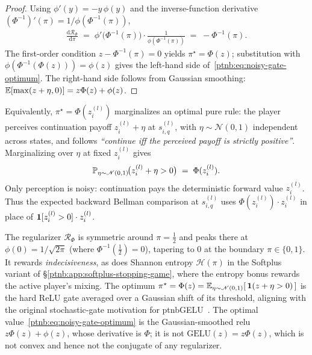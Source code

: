 \begin{proof}
Using $\phi'(y) = -y\,\phi(y)$ and the inverse-function derivative $(\Phi^{-1})'(\pi) =
    1/\phi(\Phi^{-1}(\pi))$,
\begin{align}\label{ptnb:eq:noisy-gate-deriv}
    \frac{\mathrm{d}\mathcal{R}_\Phi}{\mathrm{d}\pi}
    \;=\; \phi'\!\bigl(\Phi^{-1}(\pi)\bigr) \cdot \frac{1}{\phi(\Phi^{-1}(\pi))}
    \;=\; -\Phi^{-1}(\pi).
\end{align}
The first-order condition $z - \Phi^{-1}(\pi) = 0$ yields $\pi^\star = \Phi(z)$; substitution
with $\phi(\Phi^{-1}(\Phi(z))) = \phi(z)$ gives the left-hand side
of~\eqref{ptnb:eq:noisy-gate-optimum}. The right-hand side follows from Gaussian smoothing:
$\E[\max(z+\eta,0)] = z\Phi(z) + \phi(z)$.
\end{proof}

\begin{remark}\label{ptnb:rem:noisy-gate-perception}
Equivalently, $\pi^\star = \Phi(z_i^{(l)})$ marginalizes an optimal pure rule: the player perceives
continuation payoff $z_i^{(l)} + \eta$ at $s_{i,q}^{(l)}$, with $\eta \sim \mathcal{N}(0,1)$
independent across states, and follows \emph{``continue iff the perceived payoff is strictly
positive''}. Marginalizing over $\eta$ at fixed $z_i^{(l)}$ gives
\begin{align}\label{ptnb:eq:noisy-gate-marginal}
    \P_{\eta\sim\mathcal{N}(0,1)}\!\bigl(z_i^{(l)} + \eta > 0\bigr) \;=\; \Phi(z_i^{(l)}).
\end{align}
Only perception is noisy: continuation pays the deterministic forward value $z_i^{(l)}$.
Thus the expected backward Bellman comparison at $s_{i,q}^{(l)}$ uses
$\Phi(z_i^{(l)}) \cdot z_i^{(l)}$ in place of $\1[z_i^{(l)} >
    0]\cdot z_i^{(l)}$.
\end{remark}

The regularizer $\mathcal{R}_\Phi$ is symmetric around $\pi = \tfrac12$ and peaks there at $\phi(0)
    = 1/\sqrt{2\pi}$ (where $\Phi^{-1}(\tfrac12) = 0$), tapering to $0$ at the boundary
$\pi\in\{0,1\}$. It rewards \emph{indecisiveness}, as does Shannon entropy
$\mathcal{H}(\pi)$ in the Softplus variant of \S\ref{ptnb:app:softplus-stopping-game}, where the
entropy bonus rewards the active player's mixing. The optimum $\pi^\star =
    \Phi(z) = \E_{\eta\sim\mathcal{N}(0,1)}[\,\1(z+\eta > 0)\,]$ is the hard ReLU gate averaged over a
Gaussian shift of its threshold, aligning with the original stochastic-gate motivation for
\acs{ptnbGELU}~\parencite{Hendrycks2016}. The optimal value~\eqref{ptnb:eq:noisy-gate-optimum} is the
Gaussian-smoothed \acs{relu} $z\Phi(z) + \phi(z)$, whose derivative is $\Phi$; it is not
$\mathrm{GELU}(z) = z\Phi(z)$, which is not convex and hence not the conjugate of any regularizer.

